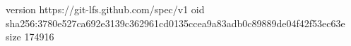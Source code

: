 version https://git-lfs.github.com/spec/v1
oid sha256:3780e527ca692e3139c362961cd0135ccea9a83adb0c89889de04f42f53ec63e
size 174916
